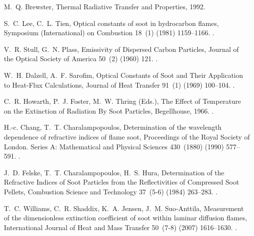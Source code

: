 \documentclass[preprint,12pt]{elsarticle}
\begin{document}
\begin{thebibliography}{10}
M.~Q. Brewster, {Thermal Radiative Transfer and Properties}, 1992.

S.~C. Lee, C.~L. Tien, {Optical constants of soot in hydrocarbon flames},
  {Symposium (International) on Combustion} 18~(1) (1981) 1159--1166.
\newblock \href {http://dx.doi.org/10.1016/S0082-0784(81)80120-8}
  {}.

V.~R. Stull, G.~N. Plass, {Emissivity of Dispersed Carbon Particles}, {Journal
  of the Optical Society of America} 50~(2) (1960) 121.
\newblock \href {http://dx.doi.org/10.1364/JOSA.50.000121}
  {}.

W.~H. Dalzell, A.~F. Sarofim, {Optical Constants of Soot and Their Application
  to Heat-Flux Calculations}, {Journal of Heat Transfer} 91~(1) (1969)
  100--104.
\newblock \href {http://dx.doi.org/10.1115/1.3580063}
  {}.

C.~R. Howarth, P.~J. Foster, M.~W. Thring (Eds.), {The Effect of Temperature on
  the Extinction of Radiation By Soot Particles}, Begellhouse, 1966.
\newblock \href {http://dx.doi.org/10.1615/IHTC3.1210}
  {}.

H.-c. Chang, T.~T. Charalampopoulos, {Determination of the wavelength
  dependence of refractive indices of flame soot}, {Proceedings of the Royal
  Society of London. Series A: Mathematical and Physical Sciences} 430~(1880)
  (1990) 577--591.
\newblock \href {http://dx.doi.org/10.1098/rspa.1990.0107}
  {}.

J.~D. Felske, T.~T. Charalampopoulos, H.~S. Hura, {Determination of the
  Refractive Indices of Soot Particles from the Reflectivities of Compressed
  Soot Pellets}, {Combustion Science and Technology} 37~(5-6) (1984) 263--283.
\newblock \href {http://dx.doi.org/10.1080/00102208408923757}
  {}.

T.~C. Williams, C.~R. Shaddix, K.~A. Jensen, J.~M. Suo-Anttila, {Measurement of
  the dimensionless extinction coefficient of soot within laminar diffusion
  flames}, {International Journal of Heat and Mass Transfer} 50~(7-8) (2007)
  1616--1630.
\newblock \href {http://dx.doi.org/10.1016/j.ijheatmasstransfer.2006.08.024}
  {}.


\end{thebibliography}
\end{document}
